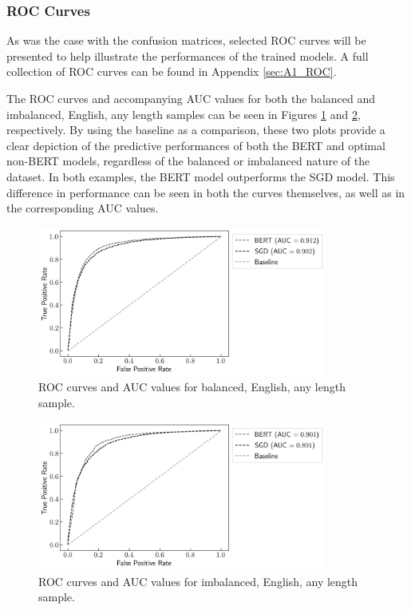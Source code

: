\subsubsection{ROC Curves}

As was the case with the confusion matrices, selected ROC curves will be presented to help illustrate the performances of the trained models. A full collection of ROC curves can be found in Appendix \ref{sec:A1_ROC}.

The ROC curves and accompanying AUC values for both the balanced and imbalanced, English, any length samples can be seen in Figures \ref{fig:Res_RF_Pol_ROC_EBA} and \ref{fig:Res_RF_Pol_ROC_EIA}, respectively. By using the baseline as a comparison, these two plots provide a clear depiction of the predictive performances of both the BERT and optimal non-BERT models, regardless of the balanced or imbalanced nature of the dataset. In both examples, the BERT model outperforms the SGD model. This difference in performance can be seen in both the curves themselves, as well as in the corresponding AUC values.

\begin{figure}[ht]
    \centering
    \includegraphics[width=0.85\textwidth]{figures/06_results/01_rfp/01_pol/02_roc/eng_eq_any.png}
    \caption{ROC curves and AUC values for balanced, English, any length sample.}
    \label{fig:Res_RF_Pol_ROC_EBA}
\end{figure}

\begin{figure}[ht]
    \centering
    \includegraphics[width=0.85\textwidth]{figures/06_results/01_rfp/01_pol/02_roc/eng_any_any.png}
    \caption{ROC curves and AUC values for imbalanced, English, any length sample.}
    \label{fig:Res_RF_Pol_ROC_EIA}
\end{figure}

